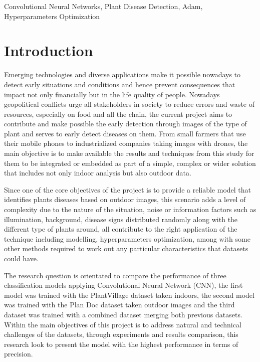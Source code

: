 \documentclass[conference]{IEEEtran}
\begin{document}
\begin{IEEEkeywords}
Convolutional Neural Networks, Plant Disease Detection, Adam, Hyperparameters Optimization 
\end{IEEEkeywords}

\section{Introduction}
Emerging technologies and diverse applications make it possible nowadays to detect early situations and conditions and hence prevent consequences that impact not only financially but in the life quality of people. Nowadays geopolitical conflicts urge all stakeholders in society to reduce errors and waste of resources, especially on food and all the chain, the current project aims to contribute and make possible the early detection through images of the type of plant and serves to early detect diseases on them. From small farmers that use their mobile phones to industrialized companies taking images with drones, the main objective is to make available the results and techniques from this study for them to be integrated or embedded as part of a simple, complex or wider solution that includes not only indoor analysis but also outdoor data. \

Since one of the core objectives of the project is to provide a reliable model that identifies plants diseases based on outdoor images, this scenario adds a level of complexity due to the nature of the situation, noise or information factors such as illumination, background, disease signs distributed randomly along with the different type of plants around, all contribute to the right application of the technique including modelling, hyperparameters optimization, among with some other methods required to work out any particular characteristics that datasets could have.  \

The research question is orientated to compare the performance of three classification models applying Convolutional Neural Network (CNN), the first model was trained with the PlantVillage dataset taken indoors, the second model was trained with the Plan Doc dataset taken outdoor images and the third dataset was trained with a combined dataset merging both previous datasets. Within the main objectives of this project is to address natural and technical challenges of the datasets, through experiments and results comparison, this research look to present the model with the  highest performance in terms of precision.  \
\end{document}

